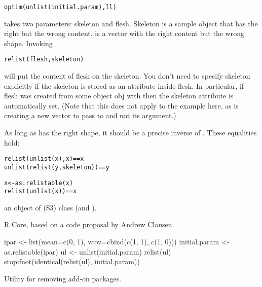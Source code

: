 \begin{Details}
\begin{alltt}
        optim(unlist(initial.param), ll)
\end{alltt}

 takes two parameters: skeleton and flesh.  Skeleton is a sample
object that has the right  but the wrong content.  
is a vector with the right content but the wrong shape.  Invoking
\begin{alltt}    relist(flesh, skeleton)\end{alltt}

will put the content of flesh on the skeleton.  You don't need to specify
skeleton explicitly if the skeleton is stored as an attribute inside flesh.
In particular, if flesh was created from some object obj with
then the skeleton attribute is automatically set.  (Note that this
does not apply to the example here, as  is creating
a new vector to pass to  and not its  argument.)

As long as  has the right shape, it should be a precise inverse
of .  These equalities hold:
\begin{alltt}   relist(unlist(x), x) == x
   unlist(relist(y, skeleton)) == y

   x <- as.relistable(x)
   relist(unlist(x)) == x
\end{alltt}

\end{Details}
%
\begin{Value}
an object of (S3) class  (and ).
\end{Value}
%
\begin{Author}\relax
R Core, based on a code proposal by Andrew Clausen.
\end{Author}
%
\begin{SeeAlso}\relax
{}
\end{SeeAlso}
%
\begin{Examples}
\begin{ExampleCode}
 ipar <- list(mean=c(0, 1), vcov=cbind(c(1, 1), c(1, 0)))
 initial.param <- as.relistable(ipar)
 ul <- unlist(initial.param)
 relist(ul)
 stopifnot(identical(relist(ul), initial.param))
\end{ExampleCode}
\end{Examples}
%
\begin{Description}\relax
Utility for removing add-on packages.
\end{Description}
